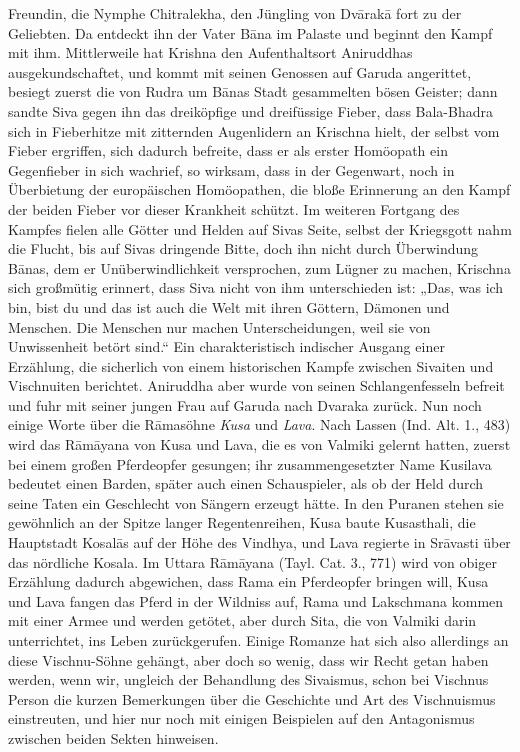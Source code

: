 \documentclass{article}
\begin{document}
Freundin, die Nymphe Chitralekha, den Jüngling von Dv\={a}rak\={a} fort zu der Geliebten. Da entdeckt ihn der Vater B\={a}na im Palaste und beginnt den Kampf mit ihm. Mittlerweile hat Krishna den Aufenthaltsort Aniruddhas ausgekundschaftet, und kommt mit seinen Genossen auf Garuda angerittet, besiegt zuerst die von Rudra um B\={a}nas Stadt gesammelten bösen Geister; dann sandte Siva gegen ihn das dreiköpfige und dreifüssige Fieber, dass Bala-Bhadra sich in Fieberhitze mit zitternden Augenlidern an Krischna hielt, der selbst vom Fieber ergriffen, sich dadurch befreite, dass er als erster Homöopath ein Gegenfieber in sich wachrief, so wirksam, dass in der Gegenwart, noch in Überbietung der europäischen Homöopathen, die bloße Erinnerung an den Kampf der beiden Fieber vor dieser Krankheit schützt. Im weiteren Fortgang des Kampfes fielen alle Götter und Helden auf Sivas Seite, selbst der Kriegsgott nahm die Flucht, bis auf Sivas dringende Bitte, doch ihn nicht durch Überwindung B\={a}nas, dem er Unüberwindlichkeit versprochen, zum Lügner zu machen, Krischna sich großmütig erinnert, dass Siva nicht von ihm unterschieden ist: „Das, was ich bin, bist du und das ist auch die Welt mit ihren Göttern, Dämonen und Menschen. Die Menschen nur machen Unterscheidungen, weil sie von Unwissenheit betört sind.“ Ein charakteristisch indischer Ausgang einer Erzählung, die sicherlich von einem historischen Kampfe zwischen Sivaiten und Vischnuiten berichtet. Aniruddha aber wurde von seinen Schlangenfesseln befreit und fuhr mit seiner jungen Frau auf Garuda nach Dvaraka zurück. Nun noch einige Worte über die R\={a}masöhne \emph{Kusa} und \emph{Lava}. Nach Lassen (Ind. Alt. 1., 483) wird das R\={a}m\={a}yana von Kusa und Lava, die es von Valmiki gelernt hatten, zuerst bei einem großen Pferdeopfer gesungen; ihr zusammengesetzter Name Kusilava bedeutet einen Barden, später auch einen Schauspieler, als ob der Held durch seine Taten ein Geschlecht von Sängern erzeugt hätte. In den Puranen stehen sie gewöhnlich an der Spitze langer Regentenreihen, Kusa baute Kusasthali, die Hauptstadt Kosal\={a}s auf der Höhe des Vindhya, und Lava regierte in Sr\={a}vasti über das nördliche Kosala. Im Uttara R\={a}m\={a}yana (Tayl. Cat. 3., 771) wird von obiger Erzählung dadurch abgewichen, dass Rama ein Pferdeopfer bringen will, Kusa und Lava fangen das Pferd in der Wildniss auf, Rama und Lakschmana kommen mit einer Armee und werden getötet, aber durch Sita, die von Valmiki darin unterrichtet, ins Leben zurückgerufen. Einige Romanze hat sich also allerdings an diese Vischnu-Söhne gehängt, aber doch so wenig, dass wir Recht getan haben werden, wenn wir, ungleich der Behandlung des Sivaismus, schon bei Vischnus Person die kurzen Bemerkungen über die Geschichte und Art des Vischnuismus einstreuten, und hier nur noch mit einigen Beispielen auf den Antagonismus zwischen beiden Sekten hinweisen.
\end{document}
